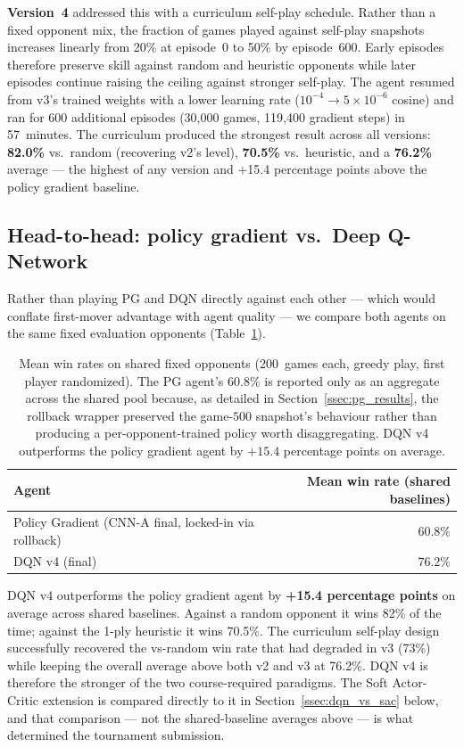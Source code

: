 \documentclass[11pt]{article}
\begin{document}
\textbf{Version~4} addressed this with a curriculum self-play schedule.
Rather than a fixed opponent mix, the fraction of games played against
self-play snapshots increases linearly from 20\% at episode~0 to 50\%
by episode~600. Early episodes therefore preserve skill against random
and heuristic opponents while later episodes continue raising the
ceiling against stronger self-play. The agent resumed from v3's trained
weights with a lower learning rate ($10^{-4}\to5\times10^{-6}$ cosine)
and ran for 600 additional episodes (30{,}000 games, 119{,}400 gradient
steps) in 57~minutes. The curriculum produced the strongest result
across all versions: \textbf{82.0\%} vs.\ random (recovering v2's
level), \textbf{70.5\%} vs.\ heuristic, and a \textbf{76.2\%} average
--- the highest of any version and $+$15.4 percentage points above the
policy gradient baseline.

\subsection{Head-to-head: policy gradient vs.\ Deep Q-Network}
\label{ssec:headtohead}

Rather than playing PG and DQN directly against each other --- which
would conflate first-mover advantage with agent quality --- we compare
both agents on the same fixed evaluation opponents (Table~\ref{tab:headtohead}).

\begin{table}[h]
  \centering
  \begin{tabular}{lr}
    \toprule
    Agent & Mean win rate (shared baselines) \\
    \midrule
    Policy Gradient (CNN-A final, locked-in via rollback) & $60.8\%$ \\
    DQN v4 (final)             & $\mathbf{76.2\%}$ \\
    \bottomrule
  \end{tabular}
  \caption{Mean win rates on shared fixed opponents (200~games each, greedy
  play, first player randomized). The PG agent's $60.8\%$ is reported only
  as an aggregate across the shared pool because, as detailed in
  Section~\ref{ssec:pg_results}, the rollback wrapper preserved the
  game-$500$ snapshot's behaviour rather than producing a
  per-opponent-trained policy worth disaggregating. DQN v4 outperforms the
  policy gradient agent by $+15.4$ percentage points on average.}
  \label{tab:headtohead}
\end{table}

DQN v4 outperforms the policy gradient agent by \textbf{+15.4 percentage
points} on average across shared baselines. Against a random opponent it
wins 82\% of the time; against the 1-ply heuristic it wins 70.5\%.
The curriculum self-play design successfully recovered the vs-random
win rate that had degraded in v3 (73\%) while keeping the overall
average above both v2 and v3 at 76.2\%. DQN v4 is therefore the
stronger of the two course-required paradigms. The Soft Actor-Critic
extension is compared directly to it in Section~\ref{ssec:dqn_vs_sac}
below, and that comparison --- not the shared-baseline averages
above --- is what determined the tournament submission.
\end{document}
